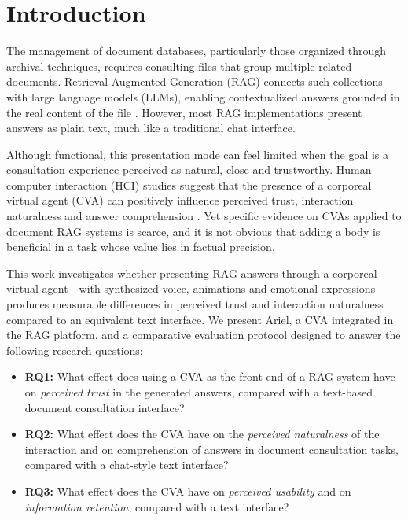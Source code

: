 \documentclass[conference]{IEEEtran}
\begin{document}
\IEEEpeerreviewmaketitle


\section{Introduction}
The management of document databases, particularly those organized through
archival techniques, requires consulting files that group multiple related
documents. Retrieval-Augmented Generation (RAG) connects such collections with
large language models (LLMs), enabling contextualized answers grounded in the
real content of the file \cite{fan2024,roy2024,haque2025}. However, most RAG
implementations present answers as plain text, much like a traditional chat
interface.

Although functional, this presentation mode can feel limited when the goal is a
consultation experience perceived as natural, close and trustworthy.
Human--computer interaction (HCI) studies suggest that the presence of a
corporeal virtual agent (CVA) can positively influence perceived trust,
interaction naturalness and answer comprehension \cite{wang2019,chang2022,
yang2025ar}. Yet specific evidence on CVAs applied to document RAG systems is
scarce, and it is not obvious that adding a body is beneficial in a task whose
value lies in factual precision.

This work investigates whether presenting RAG answers through a corporeal
virtual agent---with synthesized voice, animations and emotional
expressions---produces measurable differences in perceived trust and
interaction naturalness compared to an equivalent text interface. We present
Ariel, a CVA integrated in the RAG platform, and a comparative
evaluation protocol designed to answer the following research questions:

\begin{itemize}
\item \textbf{RQ1:} What effect does using a CVA as the front end of a RAG
system have on \emph{perceived trust} in the generated answers, compared with a
text-based document consultation interface?
\item \textbf{RQ2:} What effect does the CVA have on the \emph{perceived
naturalness} of the interaction and on comprehension of answers in document
consultation tasks, compared with a chat-style text interface?
\item \textbf{RQ3:} What effect does the CVA have on \emph{perceived usability}
and on \emph{information retention}, compared with a text interface?
\end{itemize}
\end{document}
